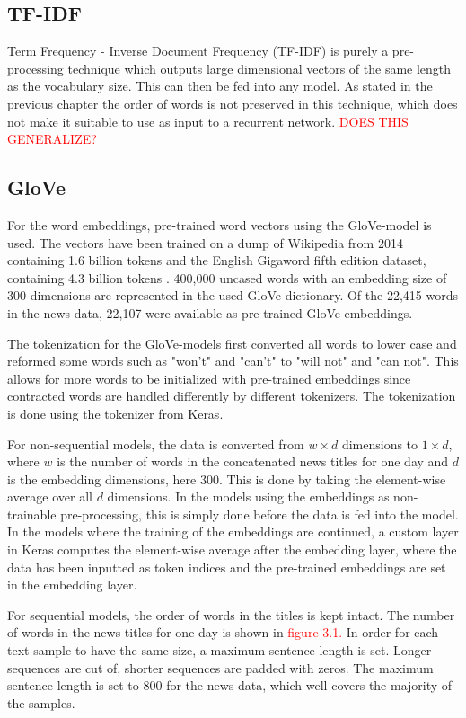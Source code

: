 \subsection{TF-IDF}

Term Frequency - Inverse Document Frequency (TF-IDF) is purely a pre-processing technique which outputs large dimensional vectors of the same length as the vocabulary size. This can then be fed into any model. As stated in the previous chapter the order of words is not preserved in this technique, which does not make it suitable to use as input to a recurrent network. \textcolor{red}{DOES THIS GENERALIZE?}

\subsection{GloVe}

For the word embeddings, pre-trained word vectors using the GloVe-model is used. The vectors have been trained on a dump of Wikipedia from 2014 containing 1.6 billion tokens and the English Gigaword fifth edition dataset, containing 4.3 billion tokens \citep{pennington2014glove}. 400,000 uncased words with an embedding size of 300 dimensions are represented in the used GloVe dictionary. Of the 22,415 words in the news data, 22,107 were available as pre-trained GloVe embeddings. 

The tokenization for the GloVe-models first converted all words to lower case and reformed some words such as "won't" and "can't" to "will not" and "can not". This allows for more words to be initialized with pre-trained embeddings since contracted words are handled differently by different tokenizers. The tokenization is done using the tokenizer from Keras.  

For non-sequential models, the data is converted from $w \times d$ dimensions to $1 \times d$, where $w$ is the number of words in the concatenated news titles for one day and $d$ is the embedding dimensions, here 300. This is done by taking the element-wise average over all $d$ dimensions. In the models using the embeddings as non-trainable pre-processing, this is simply done before the data is fed into the model. In the models where the training of the embeddings are continued, a custom layer in Keras computes the element-wise average after the embedding layer, where the data has been inputted as token indices and the pre-trained embeddings are set in the embedding layer.

For sequential models, the order of words in the titles is kept intact. The number of words in the news titles for one day is shown in \textcolor{red}{figure 3.1.} In order for each text sample to have the same size, a maximum sentence length is set. Longer sequences are cut of, shorter sequences are padded with zeros. The maximum sentence length is set to 800 for the news data, which well covers the majority of the samples. 

